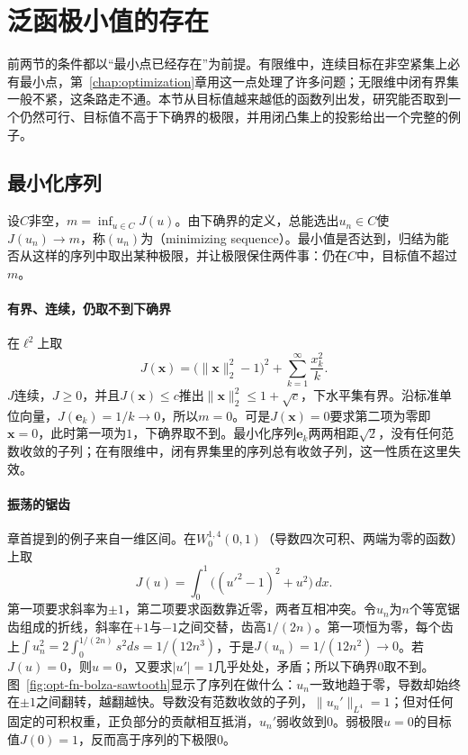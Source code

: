 
\section{泛函极小值的存在}
\label{sec:opt-fn-existence}

前两节的条件都以“最小点已经存在”为前提。有限维中，连续目标在非空紧集上必有最小点，第~\ref{chap:optimization}章用这一点处理了许多问题；无限维中闭有界集一般不紧，这条路走不通。本节从目标值越来越低的函数列出发，研究能否取到一个仍然可行、目标值不高于下确界的极限，并用闭凸集上的投影给出一个完整的例子。

\subsection{最小化序列}
\label{sec:opt-fn-minimizing-sequence}

设$C$非空，$m=\inf_{u\in C}J(u)$。由下确界的定义，总能选出$u_n\in C$使$J(u_n)\to m$，称$(u_n)$为（minimizing sequence）。最小值是否达到，归结为能否从这样的序列中取出某种极限，并让极限保住两件事：仍在$C$中，目标值不超过$m$。

\paragraph{有界、连续，仍取不到下确界}
在$\ell^2$上取
\[
 J(\bm x)=\bigl(\|\bm x\|_2^2-1\bigr)^2+\sum_{k=1}^\infty\frac{x_k^2}k .
\]
$J$连续，$J\ge0$，并且$J(\bm x)\le c$推出$\|\bm x\|_2^2\le1+\sqrt c$，下水平集有界。沿标准单位向量，$J(\bm e_k)=1/k\to0$，所以$m=0$。可是$J(\bm x)=0$要求第二项为零即$\bm x=0$，此时第一项为$1$，下确界取不到。最小化序列$\bm e_k$两两相距$\sqrt2$，没有任何范数收敛的子列；在有限维中，闭有界集里的序列总有收敛子列，这一性质在这里失效。

\paragraph{振荡的锯齿}
章首提到的例子来自一维区间。在$W_0^{1,4}(0,1)$（导数四次可积、两端为零的函数）上取
\[
 J(u)=\int_0^1\bigl((u'^2-1)^2+u^2\bigr)\,dx .
\]
第一项要求斜率为$\pm1$，第二项要求函数靠近零，两者互相冲突。令$u_n$为$n$个等宽锯齿组成的折线，斜率在$+1$与$-1$之间交替，齿高$1/(2n)$。第一项恒为零，每个齿上$\int u_n^2=2\int_0^{1/(2n)}s^2ds=1/(12n^3)$，于是$J(u_n)=1/(12n^2)\to0$。若$J(u)=0$，则$u=0$，又要求$|u'|=1$几乎处处，矛盾；所以下确界$0$取不到。图~\ref{fig:opt-fn-bolza-sawtooth}显示了序列在做什么：$u_n$一致地趋于零，导数却始终在$\pm1$之间翻转，越翻越快。导数没有范数收敛的子列，$\|u_n'\|_{L^4}=1$；但对任何固定的可积权重，正负部分的贡献相互抵消，$u_n'$弱收敛到$0$。弱极限$u=0$的目标值$J(0)=1$，反而高于序列的下极限$0$。

